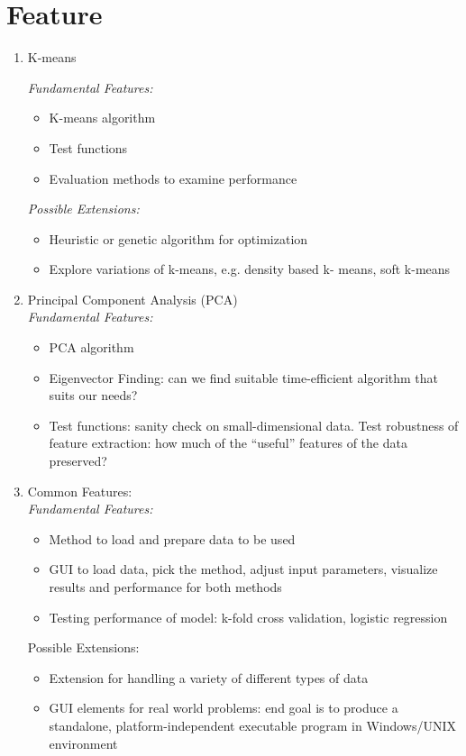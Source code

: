 \documentclass[12pt]{article} %
\begin{document}
\section{Feature}
\begin{enumerate}

	\item K-means 
	
	\emph{Fundamental Features:} 
		\begin{itemize}
			\item K-means algorithm
			\item Test functions
			\item Evaluation methods to examine performance 
		\end{itemize}
	\emph{Possible Extensions:}
		\begin{itemize}
			\item Heuristic or genetic algorithm for optimization
			\item Explore variations of k-means, e.g. density based k-		means, soft k-means 
		\end{itemize}
	\item Principal Component Analysis (PCA)\\
	\emph{Fundamental Features:}
		\begin{itemize}
			\item PCA algorithm
			\item Eigenvector Finding: can we find suitable time-efficient 			algorithm that suits our needs?  
			\item Test functions: sanity check on small-dimensional data. Test robustness of feature extraction: how much of the ``useful'' features of the data preserved?  
		\end{itemize}

	
	 
	\item Common Features: \\
		\emph{Fundamental Features:}
		\begin{itemize}
			\item Method to load and prepare data to be used 
			\item GUI to load data, pick the method, adjust input parameters, visualize results and performance for both methods 
			\item Testing performance of model: k-fold cross validation, logistic regression 
		\end{itemize}
		
		Possible Extensions:
		\begin{itemize}
			\item Extension for handling a variety of different types of data 
			\item GUI elements for real world problems: end goal is to produce a standalone, platform-independent executable program in Windows/UNIX environment  
		\end{itemize}


\end{enumerate}
\end{document}

